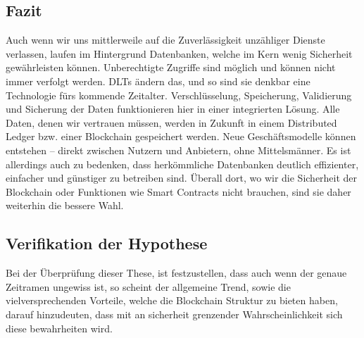 \subsection{Fazit}
Auch wenn wir uns mittlerweile auf die Zuverlässigkeit unzähliger Dienste verlassen, laufen im Hintergrund Datenbanken, welche im Kern wenig Sicherheit gewährleisten können.
Unberechtigte Zugriffe sind möglich und können nicht immer verfolgt werden. DLTs ändern das, und so sind sie denkbar eine Technologie fürs kommende Zeitalter.
Verschlüsselung, Speicherung, Validierung und Sicherung der Daten funktionieren hier in einer integrierten Lösung.
Alle Daten, denen wir vertrauen müssen, werden in Zukunft in einem Distributed Ledger bzw. einer Blockchain gespeichert werden. Neue Geschäftsmodelle können entstehen – direkt zwischen Nutzern und Anbietern, ohne Mittelsmänner.
Es ist allerdings auch zu bedenken, dass herkömmliche Datenbanken deutlich effizienter, einfacher und günstiger zu betreiben sind.
Überall dort, wo wir die Sicherheit der Blockchain oder Funktionen wie Smart Contracts nicht brauchen, sind sie daher weiterhin die bessere Wahl.

\subsection{Verifikation der Hypothese}
Bei der Überprüfung dieser These, ist festzustellen, dass auch wenn der genaue Zeitramen ungewiss ist, so scheint der allgemeine Trend, sowie die vielversprechenden Vorteile, welche die Blockchain Struktur zu bieten haben, darauf hinzudeuten, dass mit an sicherheit grenzender Wahrscheinlichkeit sich diese bewahrheiten wird.